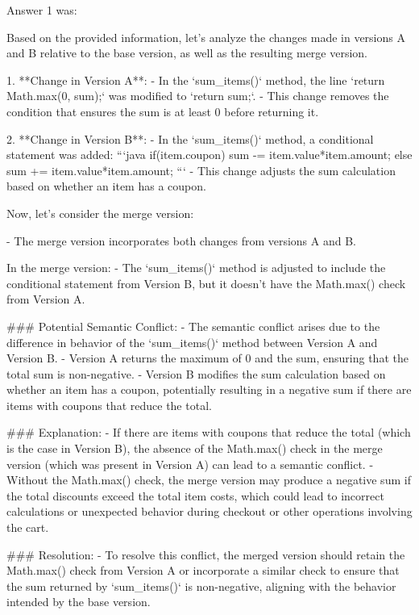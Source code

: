 Answer 1 was:
\begin{spverbatim}
Based on the provided information, let's analyze the changes made in versions A and B relative to the base version, as well as the resulting merge version.

1. **Change in Version A**:
   - In the `sum_items()` method, the line `return Math.max(0, sum);` was modified to `return sum;`.
   - This change removes the condition that ensures the sum is at least 0 before returning it.

2. **Change in Version B**:
   - In the `sum_items()` method, a conditional statement was added:
     ```java
     if(item.coupon)
         sum -= item.value*item.amount;
     else
         sum += item.value*item.amount;
     ```
   - This change adjusts the sum calculation based on whether an item has a coupon.

Now, let's consider the merge version:

- The merge version incorporates both changes from versions A and B.

In the merge version:
- The `sum_items()` method is adjusted to include the conditional statement from Version B, but it doesn't have the Math.max() check from Version A.

### Potential Semantic Conflict:
- The semantic conflict arises due to the difference in behavior of the `sum_items()` method between Version A and Version B.
- Version A returns the maximum of 0 and the sum, ensuring that the total sum is non-negative.
- Version B modifies the sum calculation based on whether an item has a coupon, potentially resulting in a negative sum if there are items with coupons that reduce the total.

### Explanation:
- If there are items with coupons that reduce the total (which is the case in Version B), the absence of the Math.max() check in the merge version (which was present in Version A) can lead to a semantic conflict.
- Without the Math.max() check, the merge version may produce a negative sum if the total discounts exceed the total item costs, which could lead to incorrect calculations or unexpected behavior during checkout or other operations involving the cart.

### Resolution:
- To resolve this conflict, the merged version should retain the Math.max() check from Version A or incorporate a similar check to ensure that the sum returned by `sum_items()` is non-negative, aligning with the behavior intended by the base version.
\end{spverbatim}

